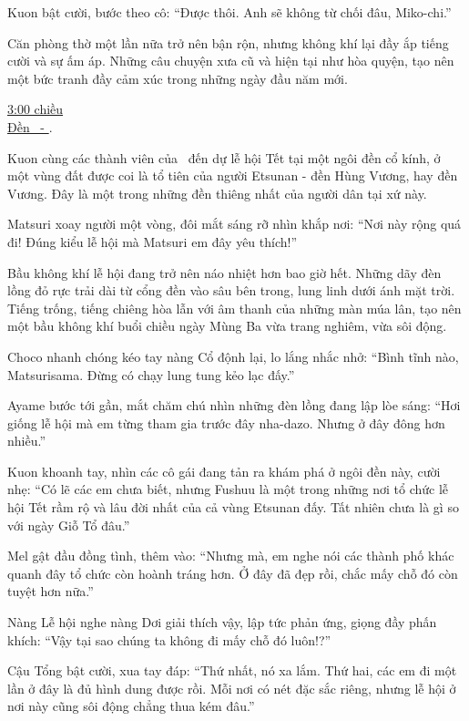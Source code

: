 \documentclass[../main.tex]{subfiles}
\begin{document}
Kuon bật cười, bước theo cô: ``Được thôi. Anh sẽ không từ chối đâu, Miko-chi.''

Căn phòng thờ một lần nữa trở nên bận rộn, nhưng không khí lại đầy ắp tiếng cười và sự ấm áp. Những câu chuyện xưa cũ và hiện tại như hòa quyện, tạo nên một bức tranh đầy cảm xúc trong những ngày đầu năm mới.

\ct

\begin{center}
    \uline{3:00 chiều\\Đền \ - }.
\end{center}

Kuon cùng các thành viên của \hll\ đến dự lễ hội Tết tại một ngôi đền cổ kính, ở một vùng đất được coi là tổ tiên của người Etsunan - đền Hùng Vương, hay đền Vương. Đây là một trong những đền thiêng nhất của người dân tại xứ này.

Matsuri xoay người một vòng, đôi mắt sáng rỡ nhìn khắp nơi: ``Nơi này rộng quá đi! Đúng kiểu lễ hội mà Matsuri em đây yêu thích!''

Bầu không khí lễ hội đang trở nên náo nhiệt hơn bao giờ hết. Những dãy đèn lồng đỏ rực trải dài từ cổng đền vào sâu bên trong, lung linh dưới ánh mặt trời. Tiếng trống, tiếng chiêng hòa lẫn với âm thanh của những màn múa lân, tạo nên một bầu không khí buổi chiều ngày Mùng Ba vừa trang nghiêm, vừa sôi động.

Choco nhanh chóng kéo tay nàng Cổ độnh lại, lo lắng nhắc nhở: ``Bình tĩnh nào, Matsurisama. Đừng có chạy lung tung kẻo lạc đấy.''

Ayame bước tới gần, mắt chăm chú nhìn những đèn lồng đang lập lòe sáng: ``Hơi giống lễ hội mà em từng tham gia trước đây nha-dazo. Nhưng ở đây đông hơn nhiều.''

Kuon khoanh tay, nhìn các cô gái đang tản ra khám phá ở ngôi đền này, cười nhẹ: ``Có lẽ các em chưa biết, nhưng Fushuu là một trong những nơi tổ chức lễ hội Tết rầm rộ và lâu đời nhất của cả vùng Etsunan đấy. Tất nhiên chưa là gì so với ngày Giỗ Tổ đâu.''

Mel gật đầu đồng tình, thêm vào: ``Nhưng mà, em nghe nói các thành phố khác quanh đây tổ chức còn hoành tráng hơn. Ở đây đã đẹp rồi, chắc mấy chỗ đó còn tuyệt hơn nữa.''

Nàng Lễ hội nghe nàng Dơi giải thích vậy, lập tức phản ứng, giọng đầy phấn khích: ``Vậy tại sao chúng ta không đi mấy chỗ đó luôn!?''

Cậu Tổng bật cười, xua tay đáp: ``Thứ nhất, nó xa lắm. Thứ hai, các em đi một lần ở đây là đủ hình dung được rồi. Mỗi nơi có nét đặc sắc riêng, nhưng lễ hội ở nơi này cũng sôi động chẳng thua kém đâu.''
\end{document}
